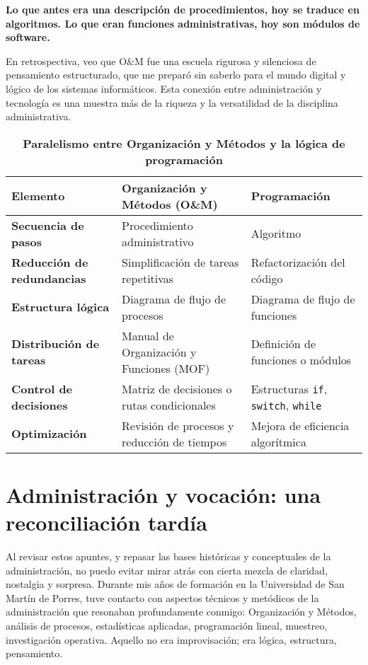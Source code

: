 \documentclass[a4paper,12pt]{article}
\begin{document}
\textbf{Lo que antes era una descripción de procedimientos, hoy se traduce en algoritmos. Lo que eran funciones administrativas, hoy son módulos de software.}

En retrospectiva, veo que O\&M fue una escuela rigurosa y silenciosa de pensamiento estructurado, que me preparó sin saberlo para el mundo digital y lógico de los sistemas informáticos. Esta conexión entre administración y tecnología es una muestra más de la riqueza y la versatilidad de la disciplina administrativa.

\begin{table}[h!]
	\centering
	\caption*{\textbf{Paralelismo entre Organización y Métodos y la lógica de programación}}
	\begin{tabularx}{\textwidth}{>{\bfseries}l X X}
		\toprule
		\textbf{Elemento} & \textbf{Organización y Métodos (O\&M)} & \textbf{Programación} \\
		\midrule
		Secuencia de pasos & Procedimiento administrativo & Algoritmo \\
		\addlinespace
		Reducción de redundancias & Simplificación de tareas repetitivas & Refactorización del código \\
		\addlinespace
		Estructura lógica & Diagrama de flujo de procesos & Diagrama de flujo de funciones \\
		\addlinespace
		Distribución de tareas & Manual de Organización y Funciones (MOF) & Definición de funciones o módulos \\
		\addlinespace
		Control de decisiones & Matriz de decisiones o rutas condicionales & Estructuras \texttt{if}, \texttt{switch}, \texttt{while} \\
		\addlinespace
		Optimización & Revisión de procesos y reducción de tiempos & Mejora de eficiencia algorítmica \\
		\bottomrule
	\end{tabularx}
\end{table}
	
\section*{Administración y vocación: una reconciliación tardía}

Al revisar estos apuntes, y repasar las bases históricas y conceptuales de la administración, no puedo evitar mirar atrás con cierta mezcla de claridad, nostalgia y sorpresa. Durante mis años de formación en la Universidad de San Martín de Porres, tuve contacto con aspectos técnicos y metódicos de la administración que resonaban profundamente conmigo: Organización y Métodos, análisis de procesos, estadísticas aplicadas, programación lineal, muestreo, investigación operativa. Aquello no era improvisación; era lógica, estructura, pensamiento.
\end{document}
